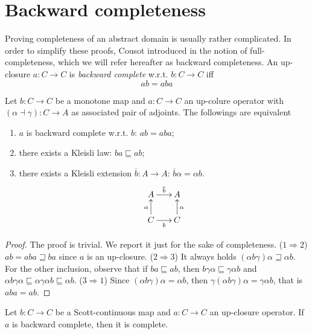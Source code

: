 \documentclass[smallcondensed,envcountsect,envcountsame]{svjour3}     %
\begin{document}
\section{Backward completeness}
%
Proving completeness of an abstract domain is usually rather complicated. In order to simplify these proofs, Cousot introduced in \cite{} the notion of full-completeness, which we will refer hereafter as backward completeness. An up-closure $a\colon C\to C$ is \emph{backward complete} w.r.t. $b\colon C\to C$ iff
\begin{equation}
ab = aba
\end{equation}

\begin{lemma}
Let $b\colon C\to C$ be a monotone map and $a\colon C\to C$ an up-colure operator with $(\alpha \dashv \gamma)\colon C \to A$ as associated pair of adjoints. 
%
The followings are equivalent
\begin{enumerate}
\item $a$ is backward complete w.r.t. $b$: $ab = aba$;
\item there exists a Kleisli law: $ba \sqsubseteq ab$;
\item there exists a Kleisli extension $\overline{b}\colon A \to A$: $\overline{b} \alpha = \alpha b$.
$$\xymatrix@R=0.2cm@C=0.2cm{A \ar[rr]^{\overline{b}} & & A\\ 
&  \\
C \ar[rr]_b \ar[uu]^\alpha & &  C \ar[uu]_\alpha
}$$
\end{enumerate}
\end{lemma}
\begin{proof}
The proof is trivial. We report it just for the sake of completeness.
($1\Rightarrow 2$) $ab = aba \sqsupseteq ba$ since $a$ is an up-closure. ($2\Rightarrow 3$) It always holds $(\alpha b \gamma) \alpha \sqsupseteq \alpha b$. For the other inclusion, observe that if $ba \sqsubseteq ab$, then $b\gamma \alpha \sqsubseteq \gamma \alpha b$ and  $\alpha b\gamma \alpha \sqsubseteq \alpha \gamma \alpha b \sqsubseteq \alpha b$.
($3 \Rightarrow 1$) Since $(\alpha b \gamma) \alpha = \alpha b$, then $\gamma (\alpha b \gamma) \alpha = \gamma\alpha b$, that is $aba = ab$.
\end{proof}
%
\begin{proposition}\label{prop:Cousot}
Let $b\colon C\to C$ be a Scott-continuous map and $a\colon C\to C$ an up-closure operator. 
If $a$ is backward complete, then it is complete. 
\end{proposition}
\end{document}
